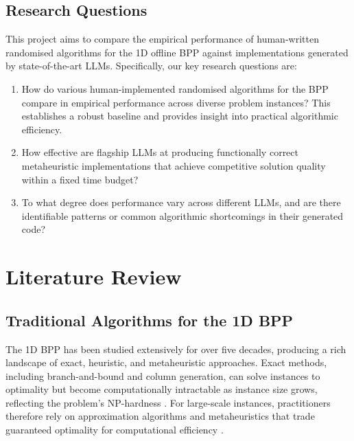 \documentclass[11pt]{article}
\begin{document}
\subsection{Research Questions}
This project aims to compare the empirical performance of human-written randomised algorithms for the 1D offline BPP against implementations generated by state-of-the-art LLMs. Specifically, our key research questions are: 
\begin{enumerate}
    \item How do various human-implemented randomised algorithms for the BPP compare in empirical performance across diverse problem instances? This establishes a robust baseline and provides insight into practical algorithmic efficiency.
    \item How effective are flagship LLMs at producing functionally correct metaheuristic implementations that achieve competitive solution quality within a fixed time budget?
    \item To what degree does performance vary across different LLMs, and are there identifiable patterns or common algorithmic shortcomings in their generated code?
\end{enumerate}

\section{Literature Review}

\subsection{Traditional Algorithms for the 1D BPP}

The 1D BPP has been studied extensively for over five decades, producing a 
rich landscape of exact, heuristic, and metaheuristic approaches. Exact 
methods, including branch-and-bound and column generation, can solve 
instances to optimality but become computationally intractable as instance 
size grows, reflecting the problem's NP-hardness \cite{garey, maxence}. For 
large-scale instances, practitioners therefore rely on approximation 
algorithms and metaheuristics that trade guaranteed optimality for 
computational efficiency \cite{munien}.
\end{document}
